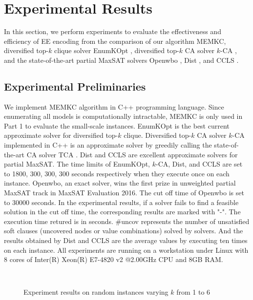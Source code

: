\documentclass{llncs}
\begin{document}
\section{Experimental Results}
In this section, we perform experiments to evaluate the effectiveness and efficiency of EE encoding from the comparison of our algorithm MEMKC, diversified top-$k$ clique solver EnumKOpt \cite{Long2015}, diversified top-$k$ CA solver $k$-CA \cite{lin_2015}, and the state-of-the-art partial MaxSAT solvers Openwbo \cite{Ruben2014}, Dist \cite{Shaowei2014}, and CCLS \cite{Luo2015}.
\subsection{Experimental Preliminaries}
We implement MEMKC algorithm in C++ programming language. Since enumerating all models is computationally intractable, MEMKC is only used in Part 1 to evaluate the small-scale instances. EnumKOpt is the best current approximate solver for diversified top-$k$ clique. Diversified top-$k$ CA solver $k$-CA implemented in C++ is an approximate solver by greedily calling the state-of-the-art CA solver TCA \cite {lin_2015}. Dist and CCLS are excellent approximate solvers for partial MaxSAT. The time limits of EnumKOpt, $k$-CA, Dist, and CCLS are set to 1800, 300, 300, 300 seconds respectively when they execute once on each instance. Openwbo, an exact solver, wins the first prize in unweighted partial MaxSAT track in MaxSAT Evaluation 2016. The cut off time of Openwbo is set to 30000 seconds. In the experimental results, if a solver fails to find a feasible solution in the cut off time, the corresponding results are marked with "-". The execution time retured is in seconds. \#uncov represents the number of unsatisfied soft clauses (uncovered nodes or value combinations) solved by solvers. And the results obtained by Dist and CCLS are the average values by executing ten times on each instance. All experiments are running on a workstation under Linux with 8 cores of Inter(R) Xeon(R) E7-4820 v2 @2.00GHz CPU and 8GB RAM.

\begin{figure}[!htb]
\setlength{\abovecaptionskip}{10pt}
 \setlength{\belowcaptionskip}{-20pt}
\centering
\subfloat{\texttt{[image: k=1.png]}}\hfill
\subfloat{\texttt{[image: k=2.png]}}\hfill
\subfloat{\texttt{[image: k=3.png]}}\hfill
\subfloat{\texttt{[image: k=4.png]}}\hfill
\subfloat{\texttt{[image: k=5.png]}}\hfill
\subfloat{\texttt{[image: k=6.png]}}\\
\caption[]{Experiment results on random instances varying $k$ from 1 to 6}
\label{fig4}
\end{figure}
\end{document}

